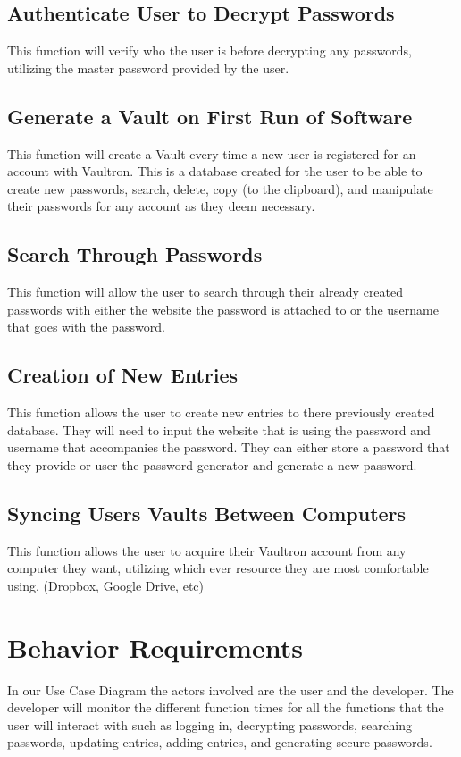 \documentclass[11pt]{report}
\begin{document}
\subsection{Authenticate User to Decrypt Passwords}
This function will verify who the user is before decrypting any passwords, utilizing 
the master password provided by the user.
\subsection{Generate a Vault on First Run of Software}
This function will create a Vault every time a new user is registered for an account 
with Vaultron. This is a database created for the user to be able to create new
passwords, search, delete, copy (to the clipboard), and manipulate their passwords
for any account as they deem necessary.
\subsection{Search Through Passwords}
This function will allow the user to search through their already created passwords
with either the website the password is attached to or the username that goes with 
the password. 
\subsection{Creation of New Entries}
This function allows the user to create new entries to there previously created 
database. They will need to input the website that is using the password and
username that accompanies the password.  They can either store a password that
they provide or user the password generator and generate a new password.
\subsection{Syncing Users Vaults Between Computers}
This function allows the user to acquire their Vaultron account from any computer 
they want, utilizing which ever resource they are most comfortable using. (Dropbox, 
Google Drive, etc)

\section{Behavior Requirements}
In our Use Case Diagram the actors involved are the user and the developer. The developer will monitor the 
different function times for all the functions that the user will interact with such as logging in, decrypting
passwords, searching passwords, updating entries, adding entries, and generating secure passwords. 
\end{document}
